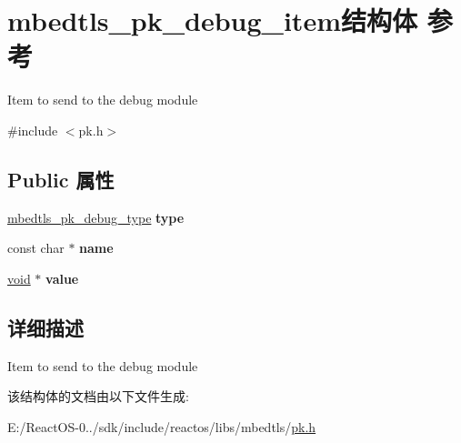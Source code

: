 \hypertarget{structmbedtls__pk__debug__item}{}\section{mbedtls\+\_\+pk\+\_\+debug\+\_\+item结构体 参考}
\label{structmbedtls__pk__debug__item}


Item to send to the debug module  




{\ttfamily \#include $<$pk.\+h$>$}

\subsection*{Public 属性}
\begin{DoxyCompactItemize}
\item 
\mbox{\label{structmbedtls__pk__debug__item_ae9d86be304da9a0adea3ad93216c2a97}} 
\hyperlink{pk_8h_a959c5419b3dd34df5420ee83bbc54002}{mbedtls\+\_\+pk\+\_\+debug\+\_\+type} {\bfseries type}
\item 
\mbox{\label{structmbedtls__pk__debug__item_a708ff418333bcfb0be9ef97d7b9d396c}} 
const char $\ast$ {\bfseries name}
\item 
\mbox{\label{structmbedtls__pk__debug__item_a1f5c5650c738f698d1bf34011996e5f2}} 
\hyperlink{interfacevoid}{void} $\ast$ {\bfseries value}
\end{DoxyCompactItemize}


\subsection{详细描述}
Item to send to the debug module 

该结构体的文档由以下文件生成\+:\begin{DoxyCompactItemize}
\item 
E\+:/\+React\+O\+S-\/0../sdk/include/reactos/libs/mbedtls/\hyperlink{pk_8h}{pk.\+h}\end{DoxyCompactItemize}
